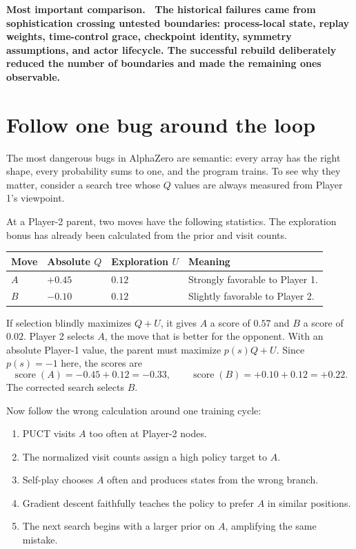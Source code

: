 \documentclass[10.5pt,letterpaper]{article}
\newcommand{\boxtitle}[1]{\sffamily\bfseries\color{deepblue}#1.\ }
\begin{document}
\begin{keybox}
\boxtitle{Most important comparison}
The historical failures came from sophistication crossing untested boundaries:
process-local state, replay weights, time-control grace, checkpoint identity,
symmetry assumptions, and actor lifecycle. The successful rebuild deliberately
reduced the number of boundaries and made the remaining ones observable.
\end{keybox}

\section{Follow one bug around the loop}

The most dangerous bugs in AlphaZero are semantic: every array has the right
shape, every probability sums to one, and the program trains. To see why they
matter, consider a search tree whose $Q$ values are always measured from
Player 1's viewpoint.

At a Player-2 parent, two moves have the following statistics. The exploration
bonus has already been calculated from the prior and visit counts.

\begin{center}
\small
\begin{tabularx}{0.78\textwidth}{L{0.15\textwidth} Y Y Y}
\toprule
\sffamily\bfseries Move &
\sffamily\bfseries Absolute $Q$ &
\sffamily\bfseries Exploration $U$ &
\sffamily\bfseries Meaning \\
\midrule
$A$ & $+0.45$ & $0.12$ & Strongly favorable to Player 1. \\
$B$ & $-0.10$ & $0.12$ & Slightly favorable to Player 2. \\
\bottomrule
\end{tabularx}
\end{center}

If selection blindly maximizes $Q+U$, it gives $A$ a score of $0.57$ and $B$
a score of $0.02$. Player 2 selects $A$, the move that is better for the
opponent. With an absolute Player-1 value, the parent must maximize
$p(s)Q+U$. Since $p(s)=-1$ here, the scores are
\[
  \operatorname{score}(A)=-0.45+0.12=-0.33,
  \qquad
  \operatorname{score}(B)=+0.10+0.12=+0.22.
\]
The corrected search selects $B$.

Now follow the wrong calculation around one training cycle:
\begin{enumerate}
  \item PUCT visits $A$ too often at Player-2 nodes.
  \item The normalized visit counts assign a high policy target to $A$.
  \item Self-play chooses $A$ often and produces states from the wrong branch.
  \item Gradient descent faithfully teaches the policy to prefer $A$ in similar
        positions.
  \item The next search begins with a larger prior on $A$, amplifying the same
        mistake.
\end{enumerate}
\end{document}

